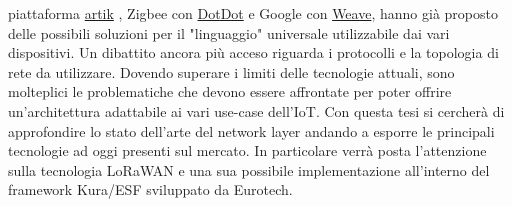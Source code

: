 piattaforma \href{https://www.artik.io}{artik}  , Zigbee con
\href{https://www.speakdotdot.com/dotdot/}{DotDot} e Google con
\href{https://developers.nest.com/weave/}{Weave}, hanno già proposto delle
possibili soluzioni per il "linguaggio" universale utilizzabile dai vari
dispositivi. Un dibattito ancora più acceso  riguarda i protocolli e la topologia di
rete da utilizzare. Dovendo superare i limiti delle tecnologie attuali, sono
molteplici le problematiche che devono essere affrontate per poter offrire un'architettura 
adattabile ai vari use-case dell'IoT.
Con questa tesi si cercherà di  approfondire lo stato dell'arte del network layer
andando a esporre le principali tecnologie ad oggi presenti sul mercato. In
particolare verrà posta l'attenzione sulla tecnologia LoRaWAN e una sua possibile
implementazione all'interno del framework Kura/ESF sviluppato da Eurotech.



